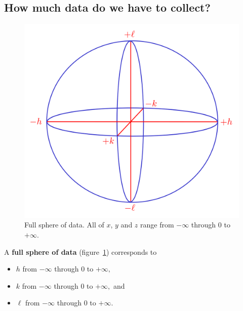 \subsection{How much data do we have to collect?}

\begin{figure}
	\centering
	\includegraphics[scale=0.12]{full_sphere.png}
	\caption{\label{fig:full_sphere}Full sphere of data. All of $x$, $y$ and $z$ range from $-\infty$ through $0$ to $+\infty.$}
\end{figure}

A \textbf{full sphere of data} (figure~\ref{fig:full_sphere}) corresponds to%
%	
	\begin{itemize}%
%	
	    \item $h$ from $-\infty$ through $0$ to $+\infty,$
	    
	    \item $k$ from $-\infty$ through $0$ to $+\infty,$ and
	    
	    \item $\ell$ from $-\infty$ through $0$ to $+\infty.$
	    
	\end{itemize}
	
